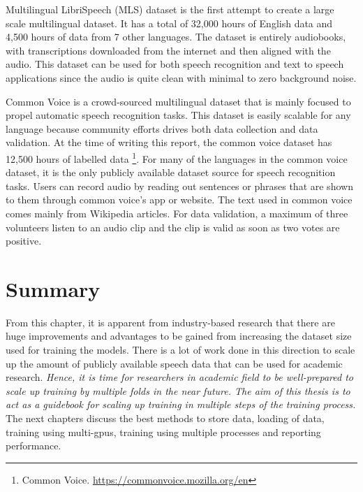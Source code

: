 Multilingual LibriSpeech (MLS) \cite{Pratap2020MLS:Research} dataset is the first attempt to create a large scale multilingual dataset. It has a total of 32,000 hours of English data and 4,500 hours of data from 7 other languages. The dataset is entirely audiobooks, with  transcriptions downloaded from the internet and then aligned with the audio. This dataset can be used for both speech recognition and text to speech applications since the audio is quite clean with minimal to zero background noise. 

Common Voice \cite{Ardila2020CommonCorpus} is a crowd-sourced multilingual dataset that is mainly focused to propel automatic speech recognition tasks. This dataset is easily scalable for any language because community efforts drives both data collection and data validation. At the time of writing this report, the common voice dataset has 12,500 hours of labelled data \footnote{Common Voice. \href{https://commonvoice.mozilla.org/en}{https://commonvoice.mozilla.org/en}}. For many of the languages in the common voice dataset, it is the only publicly available dataset source for speech recognition tasks. Users can record audio by reading out sentences or phrases that are shown to them through common voice's app or website. The text used in common voice comes mainly from Wikipedia articles. For data validation, a maximum of three volunteers listen to an audio clip and the clip is valid as soon as two votes are positive.

\section{Summary}
From this chapter, it is apparent from industry-based research that there are huge improvements and advantages to be gained from increasing the dataset size used for training the models. There is a lot of work done in this direction to scale up the amount of publicly available speech data that can be used for academic research. \emph{Hence, it is time for researchers in academic field to be well-prepared to scale up training by multiple folds in the near future. The aim of this thesis is to act as a guidebook for scaling up training in multiple steps of the training process.} The next chapters discuss the best methods to store data, loading of data, training using multi-\acrshort{gpu}s, training using multiple processes and reporting performance.

